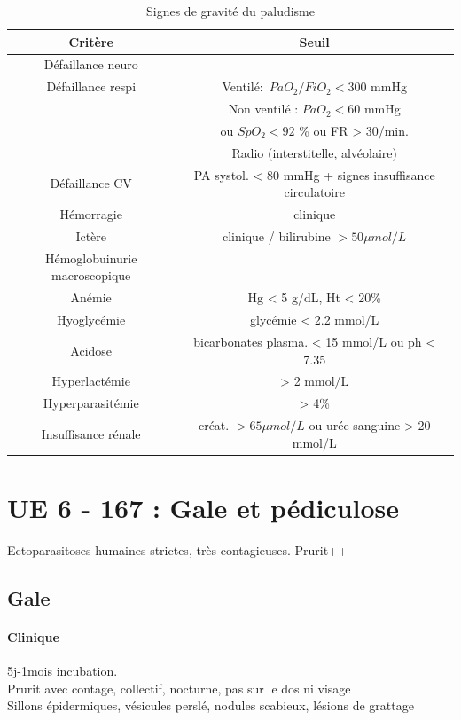 \begin{table}[htpb]
  \centering
  \caption{Signes de gravité du paludisme}
  \begin{tabular}{cc}
    \toprule
    Critère& Seuil\\
    \midrule
    Défaillance neuro& \\
    Défaillance respi& Ventilé:~\(PaO_2/FiO_2 < 300\) mmHg\\
    & Non ventilé : \(PaO_2 < 60\) mmHg\\
    & ou \(SpO_2 < 92\) \% ou FR > 30/min. \\
    &Radio (interstitelle, alvéolaire)\\
    Défaillance CV& PA systol. < 80 mmHg + signes insuffisance circulatoire\\
    Hémorragie& clinique\\
    Ictère& clinique / bilirubine \(> 50 \mu{}mol/L\)\\
    Hémoglobuinurie macroscopique& \\
    Anémie& Hg < 5 g/dL, Ht < 20\%\\
    Hyoglycémie& glycémie < 2.2 mmol/L\\
    Acidose& bicarbonates plasma. < 15 mmol/L ou ph < 7.35\\
    Hyperlactémie& > 2 mmol/L\\
    Hyperparasitémie& > 4\%\\
    Insuffisance rénale& créat. \(> 65 \mu{}mol/L\) ou urée sanguine > 20 mmol/L\\
    \bottomrule
  \end{tabular}
\end{table}

\section{UE 6 - 167 : Gale et pédiculose}

Ectoparasitoses humaines strictes, très contagieuses. Prurit++

\subsection{Gale}
\paragraph{Clinique} 5j-1mois incubation.\\
Prurit avec contage, collectif, nocturne, pas sur le dos ni visage\\
Sillons épidermiques, vésicules perslé, nodules scabieux, lésions de grattage

